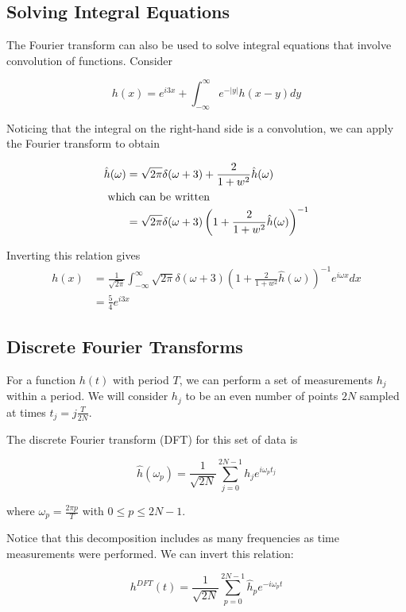 \documentclass{physics_notes}
\newcommand{\intfty}{\int_{-\infty}^\infty}
\newcommand{\intF}[3]{\frac{1}{\sqrt{2\pi}}\intfty #1 e^{i#3#2}d#2}
\begin{document}
\subsection{Solving Integral Equations}

The Fourier transform can also be used to solve integral equations that involve convolution of functions. Consider

\[ h(x) = e^{i3x} + \intfty e^{-|y|}h(x-y)dy \]

Noticing that the integral on the right-hand side is a convolution, we can apply the Fourier transform to obtain

\begin{align*}
\hat{h}(\omega) &= \sqrt{2\pi} \delta(\omega + 3) + \frac{2}{1+w^2} \hat{h}(\omega) \\
\intertext{ which can be written }
&= \sqrt{2\pi} \delta(\omega + 3)\left(1 + \frac{2}{1+w^2} \hat{h}(\omega)\right)^{-1}
\end{align*}

Inverting this relation gives
\begin{align*}
h(x) &= \intF{\sqrt{2\pi} \delta(\omega + 3)\left(1 + \frac{2}{1+w^2} \hat{h}(\omega)\right)^{-1}}{x}{\omega} \\
&= \frac{5}{4}e^{i3x}
\end{align*}

\subsection{Discrete Fourier Transforms} 

For a function $h(t)$ with period $T$, we can perform a set of measurements $h_j$ within a period. We will consider $h_j$ to be an even number of points $2N$ sampled at times $t_j = j\frac{T}{2N}$.

The discrete Fourier transform (DFT) for this set of data is

\begin{equation}\label{eq:dft}
\hat{h}(\omega_p) = \frac{1}{\sqrt{2N}}\sum_{j=0}^{2N-1} h_j e^{i\omega_p t_j}
\end{equation}

where $\omega_p = \frac{2\pi p}{T}$ with $0 \leq p \leq 2N-1$.

Notice that this decomposition includes as many frequencies as time measurements were performed. We can invert this relation:

\begin{equation*}\label{eq:inv_dft}
h^{DFT}(t) = \frac{1}{\sqrt{2N}}\sum_{p=0}^{2N-1} \hat{h}_p e^{-i\omega_p t}
\end{equation*}
\end{document}
